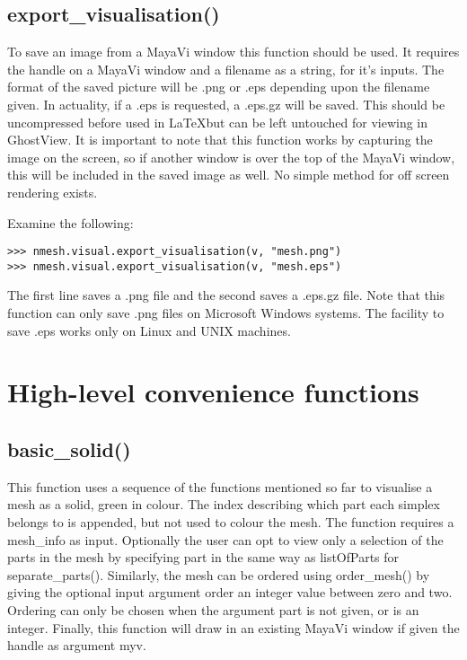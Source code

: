 \subsection{{\ttfamily export\_visualisation()}}
To save an image from a MayaVi window this function should be used. It requires the handle on a MayaVi window and a filename as a string, for it's inputs. The format of the saved picture will be {\ttfamily .png} or {\ttfamily .eps} depending upon the filename given. In actuality, if a {\ttfamily .eps} is requested, a {\ttfamily .eps.gz} will be saved. This should be uncompressed before used in \LaTeX but can be left untouched for viewing in GhostView. It is important to note that this function works by capturing the image on the screen, so if another window is over the top of the MayaVi window, this will be included in the saved image as well. No simple method for off screen rendering exists.

Examine the following:
\begin{lstlisting}[basicstyle=\small\ttfamily]
>>> nmesh.visual.export_visualisation(v, "mesh.png")
>>> nmesh.visual.export_visualisation(v, "mesh.eps")
\end{lstlisting}
The first line saves a {\ttfamily .png} file and the second saves a {\ttfamily .eps.gz} file. Note that this function can only save {\ttfamily .png} files on Microsoft Windows systems. The facility to save {\ttfamily .eps} works only on Linux and UNIX machines.



\section{High-level convenience functions}
\subsection{{\ttfamily basic\_solid()}}
This function uses a sequence of the functions mentioned so far to visualise a mesh as a solid, green in colour. The index describing which part each simplex belongs to is appended, but not used to colour the mesh. The function requires a {\ttfamily mesh\_info} as input. Optionally the user can opt to view only a selection of the parts in the mesh by specifying {\ttfamily part} in the same way as {\ttfamily listOfParts} for {\ttfamily separate\_parts()}. Similarly, the mesh can be ordered using {\ttfamily order\_mesh()} by giving the optional input argument {\ttfamily order} an integer value between zero and two. Ordering can only be chosen when the argument {\ttfamily part} is not given, or is an integer. Finally, this function will draw in an existing MayaVi window if given the handle as argument {\ttfamily myv}.

